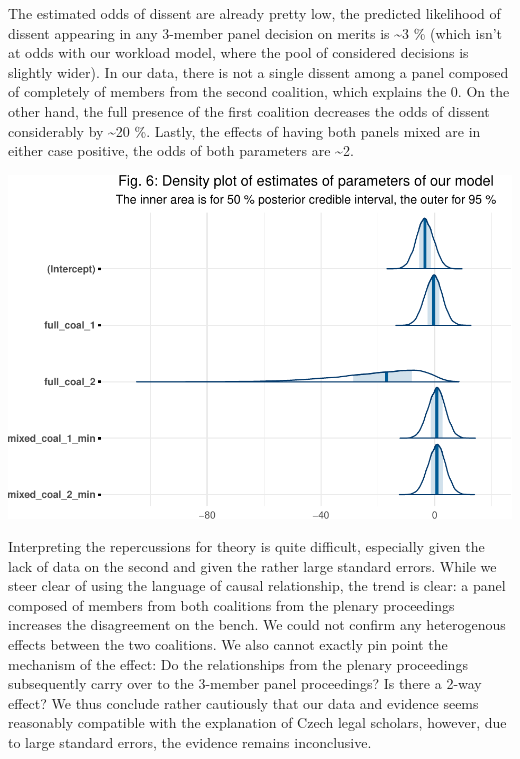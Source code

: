 \documentclass[
  11pt,
]{article}
\begin{document}
The estimated odds of dissent are already pretty low, the predicted
likelihood of dissent appearing in any 3-member panel decision on merits
is \textasciitilde3 \% (which isn't at odds with our workload model,
where the pool of considered decisions is slightly wider). In our data,
there is not a single dissent among a panel composed of completely of
members from the second coalition, which explains the 0. On the other
hand, the full presence of the first coalition decreases the odds of
dissent considerably by \textasciitilde20 \%. Lastly, the effects of
having both panels mixed are in either case positive, the odds of both
parameters are \textasciitilde2.

\vspace{10pt}

\includegraphics{dissents_article-anonymised_files/figure-latex/interval_coalition-1.pdf}

Interpreting the repercussions for theory is quite difficult, especially
given the lack of data on the second and given the rather large standard
errors. While we steer clear of using the language of causal
relationship, the trend is clear: a panel composed of members from both
coalitions from the plenary proceedings increases the disagreement on
the bench. We could not confirm any heterogenous effects between the two
coalitions. We also cannot exactly pin point the mechanism of the
effect: Do the relationships from the plenary proceedings subsequently
carry over to the 3-member panel proceedings? Is there a 2-way effect?
We thus conclude rather cautiously that our data and evidence seems
reasonably compatible with the explanation of Czech legal scholars,
however, due to large standard errors, the evidence remains
inconclusive.
\end{document}
